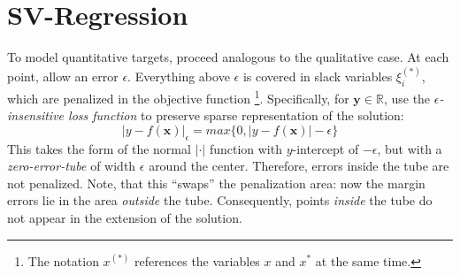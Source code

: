 \documentclass[a4paper,10pt]{article}
\begin{document}
\section{SV-Regression}
To model quantitative targets, proceed analogous to the qualitative case. At each point, allow an error $\epsilon$. Everything above $\epsilon$ is covered in slack variables $\xi_i^{(*)}$, which are penalized in the objective function \footnote{The notation $x^{(*)}$ references the variables $x$ and $x^{*}$ at the same time.}.
Specifically, for $\mathbf{y} \in \mathbb{R}$, use the $\epsilon$\textit{-insensitive loss function} to preserve sparse representation of the solution:
\begin{equation}
 |y-f(\mathbf{x})|_\epsilon = max\{0,|y-f(\mathbf{x})|-\epsilon\}
\end{equation}
This takes the form of the normal $|\cdot|$ function with $y$-intercept of $-\epsilon$, but with a \textit{zero-error-tube} of width $\epsilon$ around the center. Therefore, errors inside the tube are not penalized. Note, that this ``swaps'' the penalization area: now the margin errors lie in the area \textit{outside} the tube. Consequently, points \textit{inside} the tube do not appear in the extension of the solution.
\end{document}
